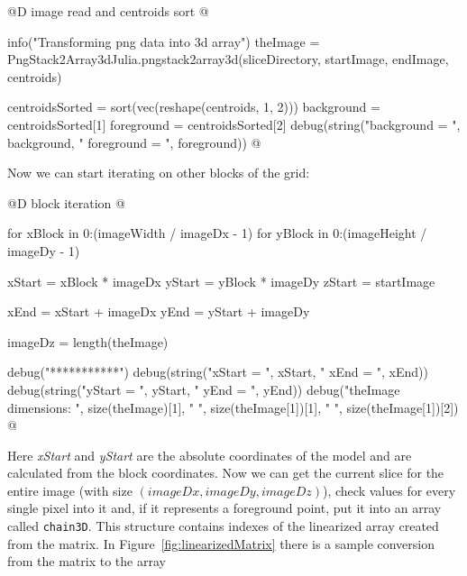 \documentclass[11pt,oneside]{article}	%
\begin{document}
@D image read and centroids sort
@{info("Transforming png data into 3d array")
theImage = PngStack2Array3dJulia.pngstack2array3d(sliceDirectory,
						startImage, endImage, centroids)

centroidsSorted = sort(vec(reshape(centroids, 1, 2)))
background = centroidsSorted[1]
foreground = centroidsSorted[2]
debug(string("background = ", background, " foreground = ", foreground))
@}

Now we can start iterating on other blocks of the grid:

@D block iteration
@{for xBlock in 0:(imageWidth / imageDx - 1)
  for yBlock in 0:(imageHeight / imageDy - 1)
  
    xStart = xBlock * imageDx
    yStart = yBlock * imageDy
    zStart = startImage
    
    xEnd = xStart + imageDx
    yEnd = yStart + imageDy
  
    imageDz = length(theImage)
  
    debug("***********")
    debug(string("xStart = ", xStart, " xEnd = ", xEnd))
    debug(string("yStart = ", yStart, " yEnd = ", yEnd))
    debug("theImage dimensions: ", size(theImage)[1], " ",
	  size(theImage[1])[1], " ", size(theImage[1])[2]) @}

Here \textit{xStart} and \textit{yStart} are the absolute coordinates of the model and are calculated from the block coordinates. Now we can get the current slice for the entire image (with size $(imageDx, imageDy, imageDz)$), check values for every single pixel into it and, if it represents a foreground point, put it into an array called \texttt{chain3D}. This structure contains indexes of the linearized array created from the matrix. In Figure~\ref{fig:linearizedMatrix} there is a sample conversion from the matrix to the array
\end{document}
